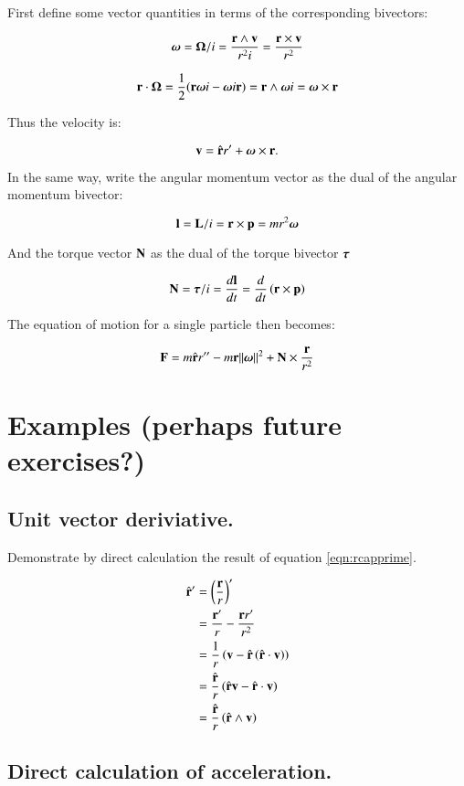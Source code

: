 \documentclass{article}      %
\newcommand{\BOmega}[0]{\boldsymbol{\Omega}}
\begin{document}
First define some vector quantities in terms of the corresponding bivectors:

\[
\Bomega = \BOmega / i = \frac{\Br \wedge \Bv}{r^2 i} = \frac{\Br \cross \Bv}{r^2}
\]

\[
\Br \cdot \BOmega = \inv{2}(\Br \Bomega i - \Bomega i \Br ) = \Br \wedge \Bomega i = \Bomega \cross \Br
\]

Thus the velocity is:

\[
\mathbf{v} = \hat{\mathbf{r}} r' + \boldsymbol{\omega} \times \mathbf{r}.
\]

In the same way, write the angular momentum vector as the dual of the angular momentum bivector:

\[
\mathbf{l} = \mathbf{L} /i = \mathbf{r} \times \mathbf{p} = m r^2 \boldsymbol{\omega}
\]

And the torque vector $\mathbf{N}$ as the dual of the torque bivector $\boldsymbol{\tau}$

\[
\mathbf{N} = \boldsymbol{\tau} /i = \frac{d\mathbf{l}}{dt} = \frac{d}{dt} \left(\mathbf{r} \times \mathbf{p} \right)
\]

The equation of motion for a single particle then becomes:

\[
\mathbf{F} = m\hat{\mathbf{r}} r'' - m \mathbf{r} \lVert{\boldsymbol{\omega}}\rVert^2 + \mathbf{N} \times \frac{\mathbf{r}}{r^2}
\]

\section{ Examples (perhaps future exercises?) }

\subsection{ Unit vector deriviative. }

Demonstrate by direct calculation the result of equation \ref{eqn:rcapprime}.

\begin{align*}
\hat{\mathbf{r}}' 
&= \left(\frac{\mathbf{r}}{r}\right)' \\
&= \frac{\mathbf{r}'}{r} - \frac{\mathbf{r} r'}{r^2} \\
&= \frac{1}{r} \left( \mathbf{v} - \hat{\mathbf{r}} \left(\hat{\mathbf{r}} \cdot \mathbf{v} \right) \right) \\
&= \frac{\hat{\mathbf{r}}}{r} \left( \hat{\mathbf{r}} \mathbf{v} - \hat{\mathbf{r}} \cdot \mathbf{v} \right) \\
&= \frac{\hat{\mathbf{r}}}{r} \left( \hat{\mathbf{r}} \wedge \mathbf{v} \right) \\
\end{align*}

\subsection{ Direct calculation of acceleration. }
\end{document}
